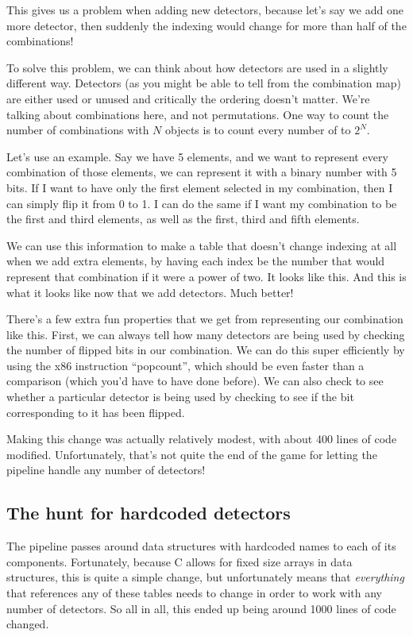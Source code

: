 \documentclass{article}
\begin{document}
This gives us a problem when adding new detectors, because let's say we add one more detector, then suddenly the indexing would change for more than half of the combinations!

To solve this problem, we can think about how detectors are used in a slightly different way.
Detectors (as you might be able to tell from the combination map) are either used or unused \textemdash{} and critically the ordering doesn't matter.
We're talking about combinations here, and not permutations.
One way to count the number of combinations with $N$ objects is to count every number of to $2^N$.

Let's use an example.
Say we have 5 elements, and we want to represent every combination of those elements, we can represent it with a binary number with 5 bits.
If I want to have only the first element selected in my combination, then I can simply flip it from 0 to 1.
I can do the same if I want my combination to be the first and third elements, as well as the first, third and fifth elements.

We can use this information to make a table that doesn't change indexing at all when we add extra elements, by having each index be the number that would represent that combination if it were a power of two.
It looks like this.
And this is what it looks like now that we add detectors.
Much better!

There's a few extra fun properties that we get from representing our combination like this.
First, we can always tell how many detectors are being used by checking the number of flipped bits in our combination.
We can do this super efficiently by using the x86 instruction ``popcount'', which should be even faster than a comparison (which you'd have to have done before).
We can also check to see whether a particular detector is being used by checking to see if the bit corresponding to it has been flipped.

Making this change was actually relatively modest, with about 400 lines of code modified.
Unfortunately, that's not quite the end of the game for letting the pipeline handle any number of detectors!

\subsection{The hunt for hardcoded detectors}

The pipeline passes around data structures with hardcoded names to each of its components.
Fortunately, because C allows for fixed size arrays in data structures, this is quite a simple change, but unfortunately means that \textit{everything} that references any of these tables needs to change in order to work with any number of detectors.
So all in all, this ended up being around 1000 lines of code changed.
\end{document}
